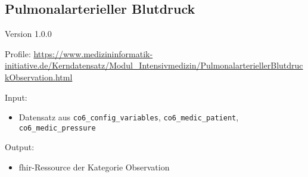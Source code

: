 \subsection{
Pulmonalarterieller Blutdruck} 
\noindent Version 1.0.0

\noindent Profile: \url{https://www.medizininformatik-initiative.de/Kerndatensatz/Modul_Intensivmedizin/PulmonalarteriellerBlutdruckObservation.html}

\noindent Input:
\begin{itemize}
	\item Datensatz aus \texttt{co6\_config\_variables}, \texttt{co6\_medic\_patient}, \\ \texttt{co6\_medic\_pressure}
\end{itemize}
Output:
\begin{itemize}
        \item \ac{fhir}-Ressource der Kategorie \glqq Observation\grqq{}
\end{itemize}
